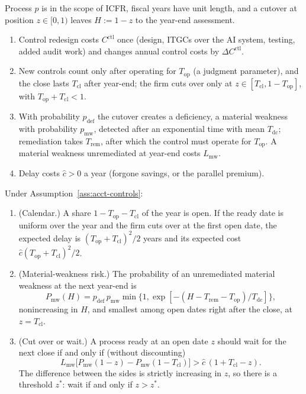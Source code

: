 \begin{assumption}\label{ass:acct-controls}
Process $p$ is in the scope of ICFR, fiscal years have unit length, and a cutover at position $z\in[0,1)$ leaves $H:=1-z$ to the year-end assessment.
\begin{enumerate}
\item[(i)] Control redesign costs $C^{\mathrm{ctl}}$ once (design, ITGCs over the AI system, testing, added audit work) and changes annual control costs by $\Delta C^{\mathrm{ctl}}$.
\item[(ii)] New controls count only after operating for $T_{\mathrm{op}}$ (a judgment parameter), and the close lasts $T_{\mathrm{cl}}$ after year-end; the firm cuts over only at $z\in[T_{\mathrm{cl}},1-T_{\mathrm{op}}]$, with $T_{\mathrm{op}}+T_{\mathrm{cl}}<1$.
\item[(iii)] With probability $p_{\mathrm{def}}$ the cutover creates a deficiency, a material weakness with probability $p_{\mathrm{mw}}$, detected after an exponential time with mean $T_{\mathrm{dc}}$; remediation takes $T_{\mathrm{rem}}$, after which the control must operate for $T_{\mathrm{op}}$. A material weakness unremediated at year-end costs $L_{\mathrm{mw}}$.
\item[(iv)] Delay costs $\hat c>0$ a year (forgone savings, or the parallel premium).
\end{enumerate}
\end{assumption}

\begin{proposition}\label{prop:acct-cutover}
Under Assumption~\ref{ass:acct-controls}:
\begin{enumerate}
\item[(a)] (Calendar.) A share $1-T_{\mathrm{op}}-T_{\mathrm{cl}}$ of the year is open. If the ready date is uniform over the year and the firm cuts over at the first open date, the expected delay is $(T_{\mathrm{op}}+T_{\mathrm{cl}})^2/2$ years and its expected cost $\hat c(T_{\mathrm{op}}+T_{\mathrm{cl}})^2/2$.
\item[(b)] (Material-weakness risk.) The probability of an unremediated material weakness at the next year-end is
\begin{equation}\label{eq:acct-pmw}
P_{\mathrm{mw}}(H)=p_{\mathrm{def}}\,p_{\mathrm{mw}}\min\bigl\{1,\exp[-(H-T_{\mathrm{rem}}-T_{\mathrm{op}})/T_{\mathrm{dc}}]\bigr\},
\end{equation}
nonincreasing in $H$, and smallest among open dates right after the close, at $z=T_{\mathrm{cl}}$.
\item[(c)] (Cut over or wait.) A process ready at an open date $z$ should wait for the next close if and only if (without discounting)
\begin{equation}\label{eq:acct-defer}
L_{\mathrm{mw}}\bigl[P_{\mathrm{mw}}(1-z)-P_{\mathrm{mw}}(1-T_{\mathrm{cl}})\bigr]>\hat c\,(1+T_{\mathrm{cl}}-z).
\end{equation}
The difference between the sides is strictly increasing in $z$, so there is a threshold $z^*$: wait if and only if $z>z^*$.
\end{enumerate}
\end{proposition}

